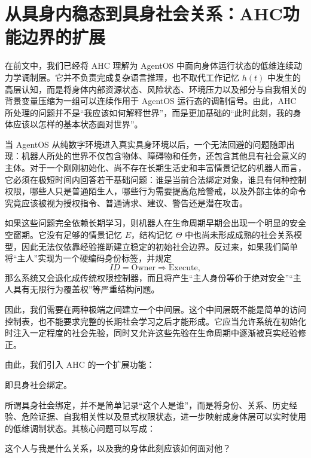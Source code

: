 \section{从具身内稳态到具身社会关系：AHC功能边界的扩展}

在前文中，我们已经将 AHC 理解为 AgentOS 中面向身体运行状态的低维连续动力学调制层。它并不负责完成复杂语言推理，也不取代工作记忆 $h(t)$ 中发生的高层认知，而是将身体内部资源状态、风险状态、环境压力以及部分与自我相关的背景变量压缩为一组可以连续作用于 AgentOS 运行态的调制信号。由此，AHC 所处理的问题并不是“我应该如何解释世界”，而是更加基础的“此时此刻，我的身体应该以怎样的基本状态面对世界”。

当 AgentOS 从纯数字环境进入真实具身环境以后，一个无法回避的问题随即出现：机器人所处的世界不仅包含物体、障碍物和任务，还包含其他具有社会意义的主体。对于一个刚刚初始化、尚不存在长期生活史和丰富情景记忆的机器人而言，它必须在极短时间内回答若干基础问题：谁是当前合法绑定对象，谁具有何种控制权限，哪些人只是普通陌生人，哪些行为需要提高危险警戒，以及外部主体的命令究竟应该被视为授权指令、普通请求、建议、警告还是潜在攻击。

如果这些问题完全依赖长期学习，则机器人在生命周期早期会出现一个明显的安全空窗期。它没有足够的情景记忆 $E$，结构记忆 $\Theta$ 中也尚未形成成熟的社会关系模型，因此无法仅依靠经验推断建立稳定的初始社会边界。反过来，如果我们简单将“主人”实现为一个硬编码身份标签，并规定
\[
ID=\mathrm{Owner}\Rightarrow \mathrm{Execute},
\]
那么系统又会退化成传统权限控制器，而且将产生“主人身份等价于绝对安全”“主人具有无限行为覆盖权”等严重结构问题。

因此，我们需要在两种极端之间建立一个中间层。这个中间层既不能是简单的访问控制表，也不能要求完整的长期社会学习之后才能形成。它应当允许系统在初始化时注入一定程度的社会先验，同时又允许这些先验在生命周期中逐渐被真实经验修正。

由此，我们引入 AHC 的一个扩展功能：

\begin{statementbox}
\centering
{}
\end{statementbox}

即具身社会绑定。

所谓具身社会绑定，并不是简单记录“这个人是谁”，而是将身份、关系、历史经验、危险证据、自我相关性以及显式权限状态，进一步映射成身体层可以实时使用的低维调制状态。其核心问题可以写成：

\begin{statementbox}
这个人与我是什么关系，以及我的身体此刻应该如何面对他？
\end{statementbox}

